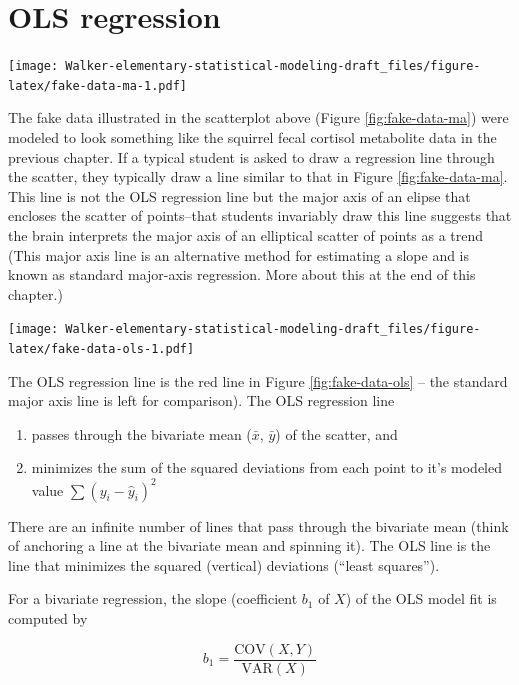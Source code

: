 \documentclass[]{book}
\providecommand{\tightlist}{%
  \setlength{\itemsep}{0pt}\setlength{\parskip}{0pt}}
\begin{document}
\hypertarget{ols-regression}{%
\section{OLS regression}\label{ols-regression}}

\texttt{[image: Walker-elementary-statistical-modeling-draft\_files/figure-latex/fake-data-ma-1.pdf]}

The fake data illustrated in the scatterplot above (Figure \ref{fig:fake-data-ma}) were modeled to look something like the squirrel fecal cortisol metabolite data in the previous chapter. If a typical student is asked to draw a regression line through the scatter, they typically draw a line similar to that in Figure \ref{fig:fake-data-ma}. This line is not the OLS regression line but the major axis of an elipse that encloses the scatter of points--that students invariably draw this line suggests that the brain interprets the major axis of an elliptical scatter of points as a trend (This major axis line is an alternative method for estimating a slope and is known as standard major-axis regression. More about this at the end of this chapter.)

\texttt{[image: Walker-elementary-statistical-modeling-draft\_files/figure-latex/fake-data-ols-1.pdf]}

The OLS regression line is the red line in Figure \ref{fig:fake-data-ols} -- the standard major axis line is left for comparison). The OLS regression line

\begin{enumerate}
\def\labelenumi{\arabic{enumi}.}
\tightlist
\item
  passes through the bivariate mean (\(\bar{x}\), \(\bar{y}\)) of the scatter, and
\item
  minimizes the sum of the squared deviations from each point to it's modeled value \(\sum{(y_i - \hat{y}_i)^2}\)
\end{enumerate}

There are an infinite number of lines that pass through the bivariate mean (think of anchoring a line at the bivariate mean and spinning it). The OLS line is the line that minimizes the squared (vertical) deviations (``least squares'').

For a bivariate regression, the slope (coefficient \(b_1\) of \(X\)) of the OLS model fit is computed by

\begin{equation}
b_1 = \frac{\mathrm{COV}(X, Y)}{\mathrm{VAR}(X)}
\end{equation}
\end{document}
